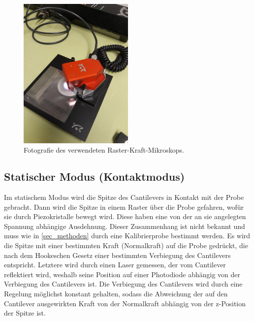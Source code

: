 \documentclass[
	a4paper,
	12pt,
	pagesize,
	ngerman
]{scrartcl}
\begin{document}
	\begin{figure}[H]
		\includegraphics[width=0.5\textwidth]{images/photo_2018-11-15_21-01-21}
		\centering
		\caption{Fotografie des verwendeten Raster-Kraft-Mikroskops.}
		\label{fig_Foto}
		\centering
	\end{figure}

	\subsection{Statischer Modus (Kontaktmodus)}
	Im statischem Modus wird die Spitze des Cantilevers in Kontakt mit der Probe gebracht.
	Dann wird die Spitze in einem Raster über die Probe gefahren, wofür sie durch Piezokristalle bewegt wird.
	Diese haben eine von der an sie angelegten Spannung abhängige Ausdehnung.
	Dieser Zusammenhang ist nicht bekannt und muss wie in \cref{sec_methoden} durch eine Kalibrierprobe bestimmt werden.
	Es wird die Spitze mit einer bestimmten Kraft (Normalkraft) auf die Probe gedrückt, die nach dem Hookeschen Gesetz einer bestimmten Verbiegung des Cantilevers entspricht.
	Letztere wird durch einen Laser gemessen, der vom Cantilever  reflektiert wird, weshalb seine Position auf einer Photodiode abhängig von der Verbiegung des Cantilevers ist. %
	Die Verbiegung des Cantilevers wird durch eine Regelung möglichst konstant gehalten, sodass die Abweichung der auf den Cantilever ausgewirkten Kraft von der Normalkraft abhängig von der z-Position der Spitze ist.
\end{document}
